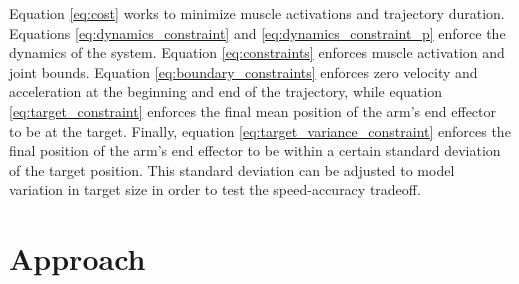 \documentclass[letterpaper, 10pt, conference]{ieeeconf}
\begin{document}
Equation \ref{eq:cost} works to minimize muscle activations and trajectory duration. Equations \ref{eq:dynamics_constraint} and \ref{eq:dynamics_constraint_p} enforce the dynamics of the system. Equation \ref{eq:constraints} enforces muscle activation and joint bounds. Equation \ref{eq:boundary_constraints} enforces zero velocity and acceleration at the beginning and end of the trajectory, while equation \ref{eq:target_constraint} enforces the final mean position of the arm's end effector to be at the target. Finally, equation \ref{eq:target_variance_constraint} enforces the final position of the arm's end effector to be within a certain standard deviation of the target position. This standard deviation can be adjusted to model variation in target size in order to test the speed-accuracy tradeoff.




\section{Approach}
\end{document}

